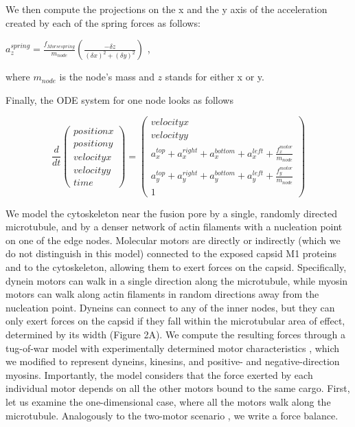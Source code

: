 We then compute the projections on the x and the y axis of the acceleration created by each of the spring forces as follows:

$a^{spring}_z = \frac{f_{Morse spring}}{m_{node}} (\frac{-\delta z}{(\delta x)^2 + (\delta y)^2})$ ,

where $m_{node}$ is the node’s mass and $z$ stands for either x or  y.

Finally, the ODE system for one node looks as follows

\begin{equation}
\frac{d}{dt}
\begin{pmatrix}
position x\\
position y\\
velocity x\\
velocity y\\
time
\end{pmatrix}
=
\begin{pmatrix}
velocity x\\
velocity y\\
a^{top}_x + a^{right}_x + a^{bottom}_x + a^{left}_x + \frac{f^{motor}_x}{m_{node}}\\
a^{top}_y + a^{right}_y + a^{bottom}_y + a^{left}_y + \frac{f^{motor}_y}{m_{node}}\\
1
\end{pmatrix}
\end{equation}

We model the cytoskeleton near the fusion pore by a single, randomly directed microtubule, and by a denser network of actin filaments with a nucleation point on one of the edge nodes. Molecular motors are directly or indirectly (which we do not distinguish in this model) connected to the exposed capsid M1 proteins and to the cytoskeleton, allowing them to exert forces on the capsid. Specifically, dynein motors can walk in a single direction along the microtubule, while myosin motors can walk along actin filaments in random directions away from the nucleation point. Dyneins can connect to any of the inner nodes, but they can only exert forces on the capsid if they fall within the microtubular area of effect, determined by its width (Figure 2A).
We compute the resulting forces through a tug-of-war model with experimentally determined motor characteristics \cite{gennerich2007force, muller2008tug, norstrom2010unconventional}, which we modified to represent dyneins, kinesins, and positive- and negative-direction myosins. Importantly, the model considers that the force exerted by each individual motor depends on all the other motors bound to the same cargo.
First, let us examine the one-dimensional case, where all the motors walk along the microtubule. Analogously to the two-motor scenario  \cite{gennerich2007force, muller2008tug, norstrom2010unconventional}, we write a force balance.

